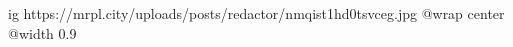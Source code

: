  
 
 
 
 

\ifcmt
  ig https://mrpl.city/uploads/posts/redactor/nmqist1hd0tsvceg.jpg
  @wrap center
  @width 0.9
\fi
